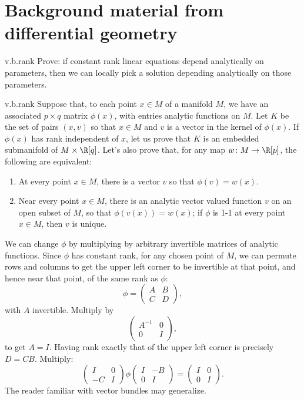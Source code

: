 \section{Background material from differential geometry}
\begin{problem}{v.b.rank}
Prove: if constant rank linear equations depend analytically on parameters, then we can locally pick a solution depending analytically on those parameters.
\end{problem}
\begin{answer}{v.b.rank}
Suppose that, to each point \(x\in M\) of a manifold \(M\), we have an associated \(p \times q\) matrix \(\phi(x)\), with entries analytic functions on \(M\).
Let \(K\) be the set of pairs \((x,v)\) so that \(x \in M\) and \(v\) is a vector in the kernel of \(\phi(x)\).
If \(\phi(x)\) has rank independent of \(x\), let us prove that \(K\) is an embedded submanifold of \(M \times \R[q]\).
Let's also prove that, for any map \(w\colon M \to \R[p]\), the following are equivalent:
\begin{enumerate}
\item At every point \(x \in M\), there is a vector \(v\) so that \(\phi(v)=w(x)\).
\item Near every point \(x \in M\), there is an analytic vector valued function \(v\) on an open subset of \(M\), so that \(\phi(v(x))=w(x)\); if \(\phi\) is 1-1 at every point \(x \in M\), then \(v\) is unique.
\end{enumerate} 
We can change \(\phi\) by multiplying by arbitrary invertible matrices of analytic functions.
Since \(\phi\) has constant rank, for any chosen point of \(M\), we can permute rows and columns to get the upper left corner to be invertible at that point, and hence near that point, of the same rank as \(\phi\):
\[
\phi=
\begin{pmatrix}
A&B\\
C&D
\end{pmatrix},
\]
with \(A\) invertible.
Multiply by 
\[
\begin{pmatrix}
A^{-1}&0\\
0&I
\end{pmatrix},
\]
to get \(A=I\).
Having rank exactly that of the upper left corner is precisely \(D=CB\).
Multiply:
\[
\begin{pmatrix}
I&0\\
-C&I
\end{pmatrix}
\phi
\begin{pmatrix}
I&-B\\
0&I
\end{pmatrix}=
\begin{pmatrix}
I&0\\
0&I
\end{pmatrix}.
\]
The reader familiar with vector bundles  \cite{Chern:1989} may generalize.
\end{answer}
